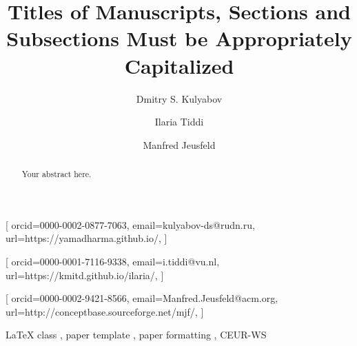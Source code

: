 \documentclass{ceurart}
\begin{document}


\title{Titles of Manuscripts, Sections and Subsections Must be Appropriately Capitalized}


\author[1,2]{Dmitry S. Kulyabov}[%
orcid=0000-0002-0877-7063,
email=kulyabov-ds@rudn.ru,
url=https://yamadharma.github.io/,
]
\cormark[1]
\fnmark[1]
\address[1]{Peoples' Friendship University of Russia (RUDN University),
  6 Miklukho-Maklaya St, Moscow, 117198, Russian Federation}
\address[2]{Joint Institute for Nuclear Research,
  6 Joliot-Curie, Dubna, Moscow region, 141980, Russian Federation}

\author[3]{Ilaria Tiddi}[%
orcid=0000-0001-7116-9338,
email=i.tiddi@vu.nl,
url=https://kmitd.github.io/ilaria/,
]
\fnmark[1]
\address[3]{Vrije Universiteit Amsterdam, De Boelelaan 1105, 1081 HV Amsterdam, The Netherlands}

\author[4]{Manfred Jeusfeld}[%
orcid=0000-0002-9421-8566,
email=Manfred.Jeusfeld@acm.org,
url=http://conceptbase.sourceforge.net/mjf/,
]
\fnmark[1]
\address[4]{University of Skövde, Högskolevägen 1, 541 28 Skövde, Sweden}


\begin{abstract}
  Your abstract here.
\end{abstract}

\begin{keywords}
  LaTeX class \sep
  paper template \sep
  paper formatting \sep
  CEUR-WS
\end{keywords}
\end{document}
